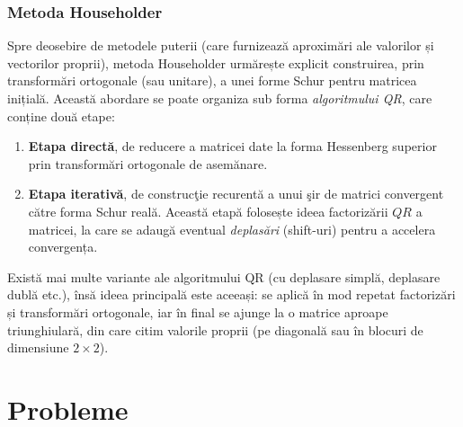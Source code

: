 \documentclass{exam}
\begin{document}
\subsubsection{Metoda Householder}

Spre deosebire de metodele puterii (care furnizează aproximări ale valorilor și vectorilor proprii), metoda Householder urmărește explicit construirea, prin transformări ortogonale (sau unitare), a unei forme Schur pentru matricea inițială. Această abordare se poate organiza sub forma \emph{algoritmului QR}, care conține două etape:

\begin{enumerate}
	\item \textbf{Etapa directă}, de reducere a matricei date la forma Hessenberg superior prin transformări ortogonale de asemănare.
	\item \textbf{Etapa iterativă}, de construcţie recurentă a unui şir de matrici convergent către forma Schur reală. Această etapă folosește ideea factorizării $QR$ a matricei, la care se adaugă eventual \emph{deplasări} (shift-uri) pentru a accelera convergența.
\end{enumerate}

Există mai multe variante ale algoritmului QR (cu deplasare simplă, deplasare dublă etc.), însă ideea principală este aceeași: se aplică în mod repetat factorizări și transformări ortogonale, iar în final se ajunge la o matrice aproape triunghiulară, din care citim valorile proprii (pe diagonală sau în blocuri de dimensiune \(2\times 2\)).



\section{Probleme}
\end{document}
